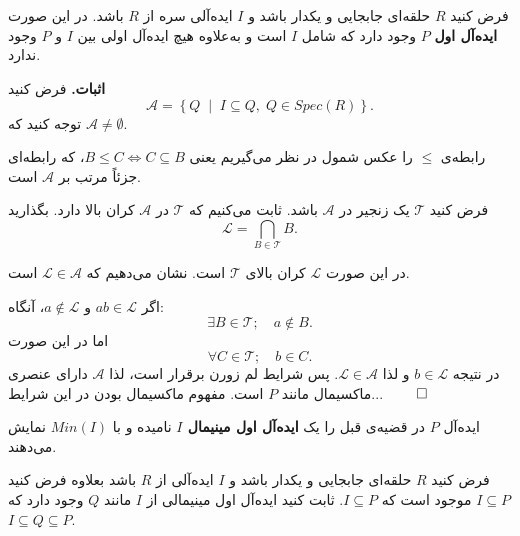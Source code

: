 \section{}

\begin{frame}
    \begin{theorem}
        فرض کنید $R$ حلقه‌ای جابجایی و یکدار باشد و $I$ ایده‌آلی سره از $R$ باشد. در این صورت \textbf{ایده‌آل اول} $P$ وجود دارد که شامل $I$ است و به‌علاوه هیچ ایده‌آل اولی بین $I$ و $P$ وجود ندارد.
    \end{theorem}
    \textbf{اثبات.}
    فرض کنید
    \[
        \mathcal{A} = \left\{ Q \;\middle|\; I \subseteq Q,\; Q \in Spec(R) \right\}.
    \]
    توجه کنید که $\mathcal{A} \ne \emptyset$.

    رابطه‌ی $\leq$ را عکس شمول در نظر می‌گیریم یعنی $B \leq C \Leftrightarrow C \subseteq B$، که رابطه‌ای جزئاً مرتب بر $\mathcal{A}$ است.

    فرض کنید $\mathcal{T}$ یک زنجیر در $\mathcal{A}$ باشد. ثابت می‌کنیم که $\mathcal{T}$ در $\mathcal{A}$ کران بالا دارد. بگذارید
    \[
        \mathcal{L} = \bigcap_{B \in \mathcal{T}} B.
    \]

\end{frame}

\begin{frame}
    در این صورت $\mathcal{L} $ کران بالای $\mathcal{T}$ است. نشان می‌دهیم که $\mathcal{L}  \in \mathcal{A}$ است.

    اگر $ab \in \mathcal{L} $ و $a \notin \mathcal{L} $، آنگاه:
    \[
        \exists B \in \mathcal{T}; \quad  a \notin B.
    \]
    اما در این صورت
    \[
        \forall C \in \mathcal{T}; \quad b \in C.
    \]
    در نتیجه \(b \in \mathcal{L}\) و لذا \(\mathcal{L} \in \mathcal{A}\).
    پس شرایط لم زورن برقرار است، لذا \(\mathcal{A}\) دارای عنصری ماکسیمال مانند \(P\) است.
    مفهوم ماکسیمال بودن در این شرایط...
    \hfill
    \(\qed\)
\end{frame}



\begin{frame}
    \begin{definition}
        ایده‌آل $P$ در قضیه‌ی قبل را یک \textbf{ایده‌آل اول مینیمال $I$} نامیده و با $Min(I)$ نمایش می‌دهند.
    \end{definition}
    \begin{exercise}
        فرض کنید $R$ حلقه‌ای جابجایی و یکدار باشد و $I$ ایده‌آلی از $R$ باشد    بعلاوه فرض کنید  $I \subseteq P$   موجود است که $I \subseteq P$. ثابت کنید ایده‌آل اول مینیمالی از \(I\) مانند \(Q\) وجود دارد که  $I \subseteq Q \subseteq P$.

    \end{exercise}

\end{frame}

